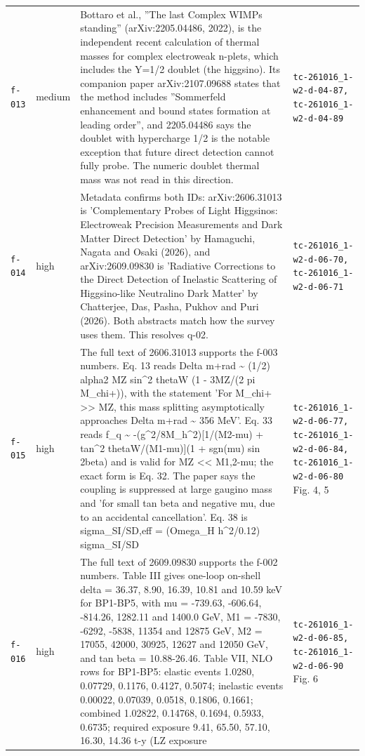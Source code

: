 \documentclass[11pt,a4paper]{article}
\begin{document}
\begin{longtable}{@{}p{}p{}p{}p{}@{}}
\texttt{f-013} & medium & Bottaro et al., ''The last Complex WIMPs standing'' (arXiv:2205.04486, 2022), is the independent recent calculation of thermal masses for complex electroweak n-plets, which includes the Y=1/2 doublet (the higgsino). Its companion paper arXiv:2107.09688 states that the method includes ''Sommerfeld enhancement and bound states formation at leading order'', and 2205.04486 says the doublet with hypercharge 1/2 is the notable exception that future direct detection cannot fully probe. The numeric doublet thermal mass was not read in this direction. & \texttt{tc-261016\_\allowbreak{}1-w2-d-04-87,\allowbreak{} tc-261016\_\allowbreak{}1-w2-d-04-89} \\
\texttt{f-014} & high & Metadata confirms both IDs: arXiv:2606.31013 is 'Complementary Probes of Light Higgsinos: Electroweak Precision Measurements and Dark Matter Direct Detection' by Hamaguchi, Nagata and Osaki (2026), and arXiv:2609.09830 is 'Radiative Corrections to the Direct Detection of Inelastic Scattering of Higgsino-like Neutralino Dark Matter' by Chatterjee, Das, Pasha, Pukhov and Puri (2026). Both abstracts match how the survey uses them. This resolves q-02. & \texttt{tc-261016\_\allowbreak{}1-w2-d-06-70,\allowbreak{} tc-261016\_\allowbreak{}1-w2-d-06-71} \\
\texttt{f-015} & high & The full text of 2606.31013 supports the f-003 numbers. Eq. 13 reads Delta m+\textbar{}rad \textasciitilde{} (1/2) alpha2 MZ sin\textasciicircum{}2 thetaW (1 - 3MZ/(2 pi M\_chi+)), with the statement 'For M\_chi+ \textgreater{}\textgreater{} MZ, this mass splitting asymptotically approaches Delta m+\textbar{}rad \textasciitilde{} 356 MeV'. Eq. 33 reads f\_q \textasciitilde{} -(g\textasciicircum{}2/8M\_h\textasciicircum{}2)[1/(M2-\textbar{}mu\textbar{}) + tan\textasciicircum{}2 thetaW/(M1-\textbar{}mu\textbar{})](1 + sgn(mu) sin 2beta) and is valid for MZ \textless{}\textless{} M1,2-\textbar{}mu\textbar{}; the exact form is Eq. 32. The paper says the coupling is suppressed at large gaugino mass and 'for small tan beta and negative mu, due to an accidental cancellation'. Eq. 38 is sigma\_SI/SD,eff = (Omega\_H h\textasciicircum{}2/0.12) sigma\_SI/SD & \texttt{tc-261016\_\allowbreak{}1-w2-d-06-77,\allowbreak{} tc-261016\_\allowbreak{}1-w2-d-06-84,\allowbreak{} tc-261016\_\allowbreak{}1-w2-d-06-80} Fig. 4, 5 \\
\texttt{f-016} & high & The full text of 2609.09830 supports the f-002 numbers. Table III gives one-loop on-shell delta = 36.37, 8.90, 16.39, 10.81 and 10.59 keV for BP1-BP5, with mu = -739.63, -606.64, -814.26, 1282.11 and 1400.0 GeV, M1 = -7830, -6292, -5838, 11354 and 12875 GeV, M2 = 17055, 42000, 30925, 12627 and 12050 GeV, and tan beta = 10.88-26.46. Table VII, NLO rows for BP1-BP5: elastic events 1.0280, 0.07729, 0.1176, 0.4127, 0.5074; inelastic events 0.00022, 0.07039, 0.0518, 0.1806, 0.1661; combined 1.02822, 0.14768, 0.1694, 0.5933, 0.6735; required exposure 9.41, 65.50, 57.10, 16.30, 14.36 t-y (LZ exposure & \texttt{tc-261016\_\allowbreak{}1-w2-d-06-85,\allowbreak{} tc-261016\_\allowbreak{}1-w2-d-06-90} Fig. 6 \\

\end{longtable}
\end{document}
